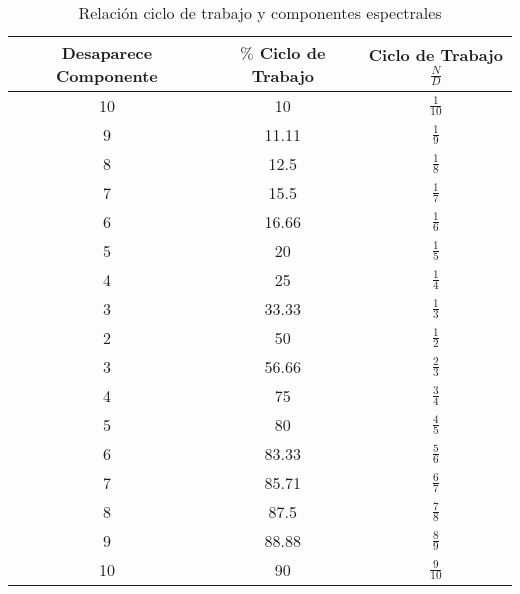 \documentclass{article}
\begin{document}
\begin{table}[h!]
\centering

\begin{tabular}{|c|c|c|}
\hline
Desaparece Componente & $\%$ Ciclo de Trabajo & Ciclo de Trabajo $\frac{N}{D}$ \\ \hline
10                    & 10                  & $\frac{1}{10}$                 \\ \hline
9                     & 11.11               & $\frac{1}{9}$                  \\ \hline
8                     & 12.5                & $\frac{1}{8}$                  \\ \hline
7                     & 15.5                & $\frac{1}{7}$                  \\ \hline
6                     & 16.66               & $\frac{1}{6}$                  \\ \hline
5                     & 20                  & $\frac{1}{5}$                  \\ \hline
4                     & 25                  & $\frac{1}{4}$                  \\ \hline
3                     & 33.33               & $\frac{1}{3}$                  \\ \hline
2                     & 50                  & $\frac{1}{2}$                  \\ \hline
3                     & 56.66               & $\frac{2}{3}$                  \\ \hline
4                     & 75                  & $\frac{3}{4}$                  \\ \hline
5                     & 80                  & $\frac{4}{5}$                  \\ \hline
6                     & 83.33               & $\frac{5}{6}$
\\ \hline
7                     & 85.71               & $\frac{6}{7}$                  \\ \hline
8                     & 87.5                & 
$\frac{7}{8}$              \\ \hline
9                     & 88.88               & $\frac{8}{9}$                  \\ \hline
10                    & 90                  & $\frac{9}{10}$                 \\ \hline
\end{tabular}

\caption{Relación ciclo de trabajo y componentes espectrales}
\label{desaparecenComponentesEspectrales}

\end{table}
\end{document}
